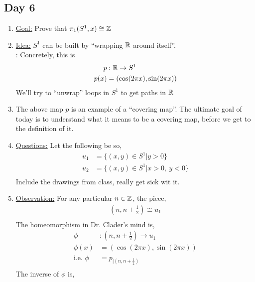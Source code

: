 \subsection{Day 6}
    \begin{enumerate}
        \item \underline{Goal:} Prove that $\pi_{1}(S^1, x)\cong \mathbb{Z}$
        \item \underline{Idea:} $S^1$ can be built by ``wrapping $\mathbb{R}$ around itself''.\\:
            Concretely, this is
            \begin{align*}
                p&: \mathbb{R} \rightarrow S^1\\
                p(x)&=(\cos(2\pi x), \sin(2\pi x))\\
            \end{align*}
            We'll try to ``unwrap'' loops in $S^1$ to get paths in $\mathbb{R}$
        \item
            The above map $p$ is an example of a ``covering map''. The ultimate goal of today is to understand
            what it means to be a covering map, before we get to the definition of it.\\
        \item \underline{Questions:} Let the following be so,
            \begin{align*}
                u_1&=\{(x,y)\in S^1| y>0\}\\
                u_2&=\{(x,y)\in S^1| x>0,\ y<0\}\\
            \end{align*}
            Include the drawings from class, really get sick wit it.
        \item \underline{Observation:} For any particular $n\in \mathbb{Z}$, the piece,
            \begin{align*}
                (n, n+\frac{1}{2})\cong u_1\\
            \end{align*}
            The homeomorphism in Dr. Clader's mind is,
            \begin{align*}
                \phi&: (n,n+\frac{1}{2})\rightarrow u_1\\
                \phi(x)&=(\cos(2\pi x), \sin(2\pi x))\\
                \text{i.e. } \phi&=p_{|(n,n+\frac{1}{2})}\\
            \end{align*}
            The inverse of $\phi$ is,

\end{enumerate}
